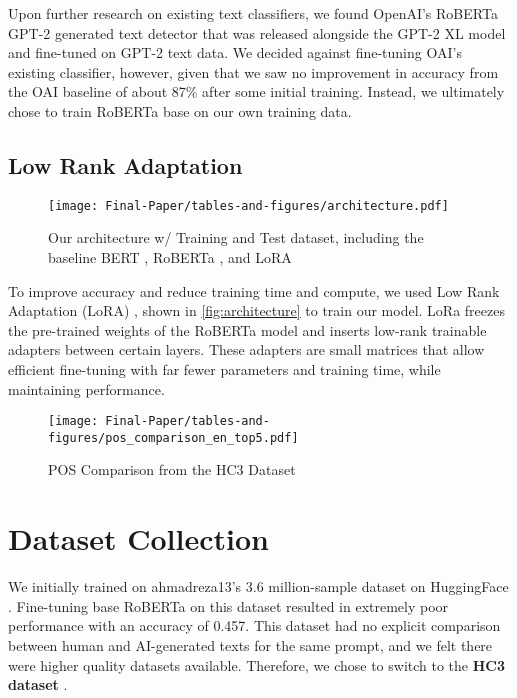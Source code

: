 \documentclass[11pt]{article}
\begin{document}
Upon further research on existing text classifiers, we found OpenAI's RoBERTa GPT-2 generated text detector \cite{openai_roberta_detector} that was released alongside the GPT-2 XL model and fine-tuned on GPT-2 text data. We decided against fine-tuning OAI's existing classifier, however, given that we saw no improvement in accuracy from the OAI baseline of about 87\% after some initial training. Instead, we ultimately chose to train RoBERTa base on our own training data.

\subsection{Low Rank Adaptation}
\label{sec:intro_lora}
\begin{figure*}[ht]
  \centering
  \texttt{[image: Final-Paper/tables-and-figures/architecture.pdf]}
    \caption{Our architecture w/ Training and Test dataset, including the baseline BERT \cite{devlin2019bert}, RoBERTa \cite{liu2020roberta}, and LoRA \cite{hu2021lora}}
  \label{fig:architecture}
\end{figure*}


To improve accuracy and reduce training time and compute, we used Low Rank Adaptation (LoRA) \cite{hu2021lora}, shown in \autoref{fig:architecture} to train our model. LoRa freezes the pre-trained weights of the RoBERTa model and inserts low-rank trainable adapters between certain layers. These adapters are small matrices that allow efficient fine-tuning with far fewer parameters and training time, while maintaining performance.

\begin{figure}[H]
    \centering
    \texttt{[image: Final-Paper/tables-and-figures/pos\_comparison\_en\_top5.pdf]}
    \caption{POS Comparison \cite{marcus1993building} from the HC3 Dataset \cite{guo2023hc3}}
    \label{fig:data-pdf}
\end{figure}



\section{Dataset Collection}
\label{sec:dataset}
\vspace{-2mm}


We initially trained on ahmadreza13's 3.6 million-sample dataset on HuggingFace \cite{ahmadreza13_human_vs_Ai_generated_dataset}. Fine-tuning base RoBERTa on this dataset resulted in extremely poor performance with an accuracy of 0.457. This dataset had no explicit comparison between human and AI-generated texts for the same prompt, and we felt there were higher quality datasets available. Therefore, we chose to switch to the \textbf{HC3 dataset} \cite{guo2023hc3}.
\end{document}
